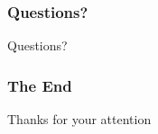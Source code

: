 \documentclass{beamer}
\begin{document}
\begin{frame}
 \frametitle{Questions?}
\begin{center}

{\Huge Questions?}
\end{center}
\end{frame}

\begin{frame}
 \frametitle{The End}
\begin{center}

{\Huge Thanks for your attention}
\end{center}
\end{frame}



% 
\end{document}
